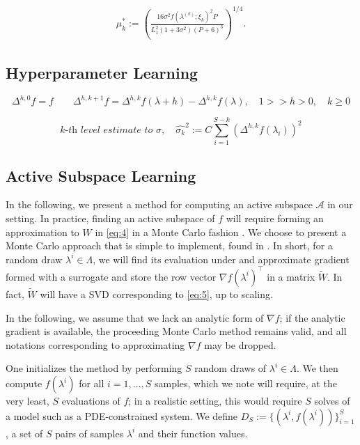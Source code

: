 \documentclass{amsart}
\newcommand{\A}{\mathcal{A}}
\begin{document}
\begin{eqnarray} \label{eq:10}
\mu^*_k:=\left( \frac{16 \sigma^2 f(\lambda^{(k)};\xi_k)^2 P}{L_1^2(1+3\sigma^2)(P+6)^3}\right)^{1/4}.
\end{eqnarray} 

\noindent 


\subsection{Hyperparameter Learning}


$$\Delta^{h,0} f =f \quad \quad \Delta^{h,k+1} f=\Delta^{h,k} f(\lambda+h)- \Delta^{h,k} f(\lambda), \quad 1>>h>0, \quad k \geq 0$$



$$\textit{$k$-th level estimate to $\sigma,$}\quad \hat{\sigma_k}^2:=C\sum_{i=1}^{S-k}\left(\Delta^{h,k}f(\lambda_i)\right)^2$$


\subsection{Active Subspace Learning}

In the following, we present a method for computing an active subspace $\A$ in our setting. In practice, finding an active subspace of $f$ will require forming an approximation to $W$ in \eqref{eq:4} in a Monte Carlo fashion \cite{ConstantineMC}. We choose to present a Monte Carlo approach that is simple to implement, found in \cite{Russi}. In short, for a random draw $\lambda^i \in \Lambda$, we will find its evaluation under and approximate gradient formed with a surrogate and store the row vector $\nabla f(\lambda^i)^\top$ in a matrix $\tilde{W}$. In fact, $\tilde{W}$ will have a SVD corresponding to \eqref{eq:5}, up to scaling.

In the following, we assume that we lack an analytic form of $\nabla f$; if the analytic gradient is available, the proceeding Monte Carlo method remains valid, and all notations corresponding to approximating $\nabla f$ may be dropped.


One initializes the method by performing $S$ random draws of $\lambda^i \in \Lambda$. We then compute $f(\lambda^i)$ for all $i=1,\ldots,S$ samples, which we note will require, at the very least, $S$ evaluations of $f$; in a realistic setting, this would require $S$ solves of a model such as a PDE-constrained system. We define $D_S:=\{(\lambda^i,f(\lambda^i))\}_{i=1}^S$, a set of $S$ pairs of samples $\lambda^i$ and their function values. 
\end{document}
